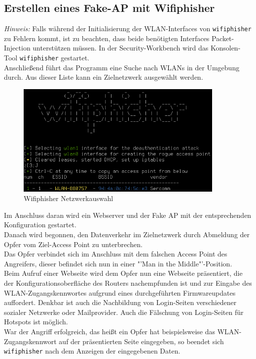 \subsection{Erstellen eines Fake-AP mit Wifiphisher}
\textit{Hinweis:} Falls während der Initialisierung der WLAN-Interfaces von \colorbox{altgray}{\lstinline|wifiphisher|} zu Fehlern kommt, ist zu beachten, dass beide benötigten Interfaces Packet-Injection unterstützen müssen. 
In der Security-Workbench wird das Konsolen-Tool \colorbox{altgray}{\lstinline|wifiphisher|} gestartet.\\
Anschließend führt das Programm eine Suche nach WLANs in der Umgebung durch. Aus dieser Liste kann ein  Zielnetzwerk ausgewählt werden. 
\begin{figure}[H]
	\centering
	\includegraphics[width=0.9\textwidth]{images/WLAN/wifiphisher.png}
	\caption{Wifiphisher Netzwerkauswahl}
\end{figure}
\noindent Im Anschluss daran wird ein Webserver und der Fake AP mit der entsprechenden Konfiguration gestartet. \\
Danach wird begonnen, den Datenverkehr im Zielnetzwerk durch Abmeldung der Opfer vom Ziel-Access Point zu unterbrechen. \\
Das Opfer verbindet sich im Anschluss mit dem falschen Access Point des Angreifers, dieser befindet sich nun in einer "'Man in the Middle"'-Position. \\
Beim Aufruf einer Webseite wird dem Opfer nun eine Webseite präsentiert, die der Konfigurationsoberfläche des Routers nachempfunden ist und zur Eingabe des WLAN-Zugangskennwortes aufgrund eines durchgeführten Firmwareupdates auffordert. Denkbar ist auch die Nachbildung von Login-Seiten verschiedener sozialer Netzwerke oder Mailprovider. Auch die Fälschung von Login-Seiten für Hotspots ist möglich. \\
War der Angriff erfolgreich, das heißt ein Opfer hat beispielsweise das WLAN-Zugangskennwort auf der präsentierten Seite eingegeben, so beendet sich \colorbox{altgray}{\lstinline|wifiphisher|} nach dem Anzeigen der eingegebenen Daten.

